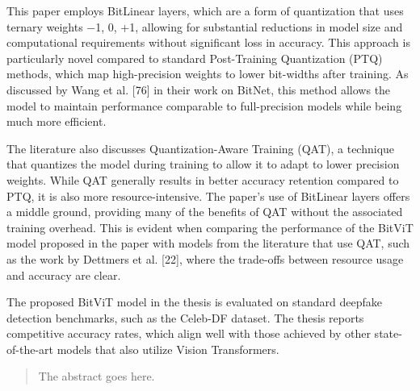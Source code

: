 \documentclass[conference]{IEEEtran}
\begin{document}
		
		This paper employs BitLinear layers, which are a form of quantization that uses ternary weights {−1, 0, +1}, allowing for substantial reductions in model size and computational requirements without significant loss in accuracy. This approach is particularly novel compared to standard Post-Training Quantization (PTQ) methods, which map high-precision weights to lower bit-widths after training. As discussed by Wang et al. [76] in their work on BitNet, this method allows the model to maintain performance comparable to full-precision models while being much more efficient.
		
		The literature also discusses Quantization-Aware Training (QAT), a technique that quantizes the model during training to allow it to adapt to lower precision weights. While QAT generally results in better accuracy retention compared to PTQ, it is also more resource-intensive. The paper’s use of BitLinear layers offers a middle ground, providing many of the benefits of QAT without the associated training overhead. This is evident when comparing the performance of the BitViT model proposed in the paper with models from the literature that use QAT, such as the work by Dettmers et al. [22], where the trade-offs between resource usage and accuracy are clear.
		
		The proposed BitViT model in the thesis is evaluated on standard deepfake detection benchmarks, such as the Celeb-DF dataset. The thesis reports competitive accuracy rates, which align well with those achieved by other state-of-the-art models that also utilize Vision Transformers.
		
		
		
		
		
		
		
		
		
		
		
		
		
		
		
		\begin{abstract}
			The abstract goes here.
		\end{abstract}
		
		
		
		
		
		\IEEEpeerreviewmaketitle
		
\end{document}
